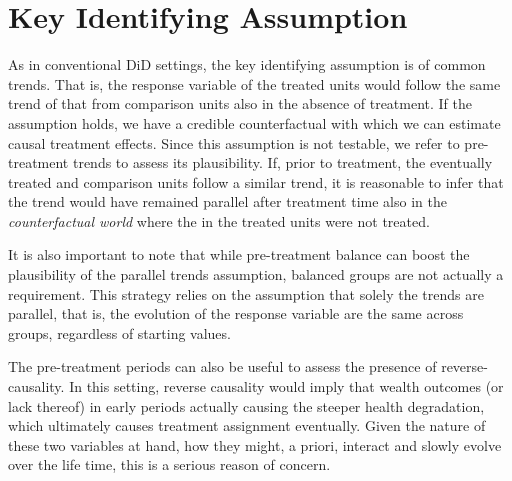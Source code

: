 \section{Key Identifying Assumption}

As in conventional DiD settings, the key identifying assumption is of common trends. That is, the
response variable of the treated units would follow the same trend of that from comparison units
also in the absence of treatment. If the assumption holds, we have a credible counterfactual 
with which we can estimate causal treatment effects. Since this assumption is not testable, we
refer to pre-treatment trends to assess its plausibility. If, prior to treatment, the eventually
treated and comparison units follow a similar trend, it is reasonable to infer that the 
trend would have remained parallel after treatment time also in the \textit{counterfactual world} where 
the in the treated units were not treated. 

It is also important to note that while pre-treatment balance can boost the plausibility of the
parallel trends assumption, balanced groups are not actually a requirement. This strategy relies on
the assumption that solely the trends are parallel, that is, the evolution of the response variable
are the same across groups, regardless of starting values.

The pre-treatment periods can also be useful to assess the presence of reverse-causality. In this
setting, reverse causality would imply that wealth outcomes (or lack thereof) in early periods
actually causing the steeper health degradation, which ultimately causes treatment assignment
eventually. Given the nature of these two variables at hand, how they might, a priori, interact and
slowly evolve over the life time, this is a serious reason of concern.





